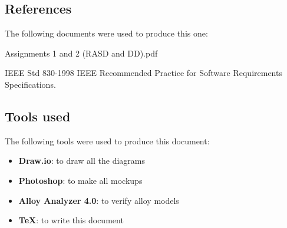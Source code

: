 \subsection{References}
The following documents were used to produce this one:
\begingroup
\renewcommand{\section}[2]{}%
\begin{thebibliography}{9}
Assignments 1 and 2 (RASD and DD).pdf

IEEE Std 830-1998 IEEE Recommended Practice for Software Requirements
Specifications.
\end{thebibliography}
\endgroup

\subsection{Tools used}
The following tools were used to produce this document:
\begin{itemize}
\item \textbf{Draw.io}: to draw all the diagrams
\item \textbf{Photoshop}: to make all mockups
\item \textbf{Alloy Analyzer 4.0}: to verify alloy models
\item \textbf{TeX}: to write this document
\end{itemize}
